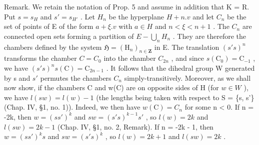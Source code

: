 Remark. We retain the notation of Prop. 5 and assume in addition that K = R. Put \(s = s_{H}\) and \(s' = s_{H'}\) . Let \(H_{n}\) be the hyperplane \(H + n.v\) and let \(C_{n}\) be the set of points of E of the form \(a + \xi.v\) with \(a \in H\) and \(n < \xi < n + 1\) . The \(C_{n}\) are connected open sets forming a partition of \(E - \bigcup_{n} H_{n}\) . They are therefore the chambers defined by the system \(\mathfrak{H} = (\mathrm{H}_{n})_{n \in \mathbf{Z}}\) in E. The translation \((s's)^{n}\) transforms the chamber \(C = C_{0}\) into the chamber \(C_{2n}\) , and since \(s(\mathrm{C}_{0}) = \mathrm{C}_{-1}\) , we have \((s's)^{n}s(\mathrm{C}) = \mathrm{C}_{2n-1}\) . It follows that the dihedral group W generated by s and \(s'\) permutes the chambers \(C_{n}\) simply-transitively. Moreover, as we shall now show, if the chambers C and w(C) are on opposite sides of H (for \(w \in W\) ), we have \(l(sw) = l(w) - 1\) (the lengths being taken with respect to S = \{s, s'\} (Chap. IV, §1, no. 1)). Indeed, we then have \(w(\mathrm{C}) = C_{n}\) for some n \textless{} 0. If n = -2k, then \(w = (ss')^{k}\) and \(sw = (s's)^{k-1}s'\) , so \(l(w) = 2k\) and \(l(sw) = 2k - 1\) (Chap. IV, §1, no. 2, Remark). If n = -2k - 1, then \(w = (ss')^{k}s\) and \(sw = (s's)^{k}\) , so \(l(w) = 2k + 1\) and \(l(sw) = 2k\) .

